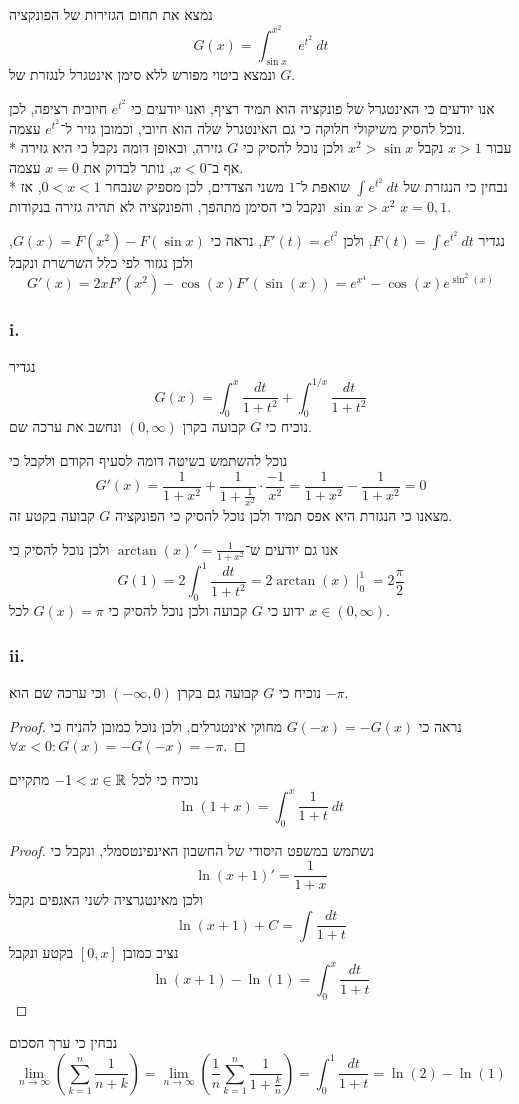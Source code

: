 \Question{}
נמצא את תחום הגזירות של הפונקציה
\[
	G(x) = \int_{\sin x}^{x^2} e^{t^2}\ dt
\]
ונמצא ביטוי מפורש ללא סימן אינטגרל לנגזרת של $G$.

אנו יודעים כי האינטגרל של פונקציה הוא תמיד רציף, ואנו יודעים כי $e^{t^2}$ חיובית רציפה, לכן נוכל להסיק משיקולי חלוקה כי גם האינטגרל שלה הוא חיובי, וכמובן גזיר ל־$e^{t^2}$ עצמה. \\*
עבור $x > 1$ נקבל $x^2 > \sin x$ ולכן נוכל להסיק כי $G$ גזירה, ובאופן דומה נקבל כי היא גזירה אף ב־$x < 0$, נותר לבדוק את $x = 0$ עצמה. \\*
נבחין כי הנגזרת של $\int e^{t^2}\ dt$ שואפת ל־$1$ משני הצדדים, לכן מספיק שנבחר $0 < x < 1$, אז $\sin x > x^2$ ונקבל כי הסימן מתהפך, והפונקציה לא תהיה גזירה בנקודות $x = 0, 1$.

נגדיר $F(t) = \int e^{t^2}\ dt$, ולכן $F'(t) = e^{t^2}$, נראה כי $G(x) = F(x^2) - F(\sin x)$, ולכן נגזור לפי כלל השרשרת ונקבל
\[
	G'(x) = 2x F'(x^2) - \cos(x) F'(\sin(x)) = e^{x^4} - \cos(x) e^{\sin^2(x)}
\]

\Subquestion{}
\subsubsection{i.}
נגדיר
\[
	G(x) = \int_{0}^{x} \frac{dt}{1 + t^2} + \int_{0}^{1/x} \frac{dt}{1 + t^2}
\]
נוכיח כי $G$ קבועה בקרן $(0, \infty)$ ונחשב את ערכה שם.

נוכל להשתמש בשיטה דומה לסעיף הקודם ולקבל כי
\[
	G'(x) = \frac{1}{1 + x^2} + \frac{1}{1 + \frac{1}{x^2}} \cdot \frac{-1}{x^2}
	= \frac{1}{1 + x^2} - \frac{1}{1 + x^2}
	= 0
\]
מצאנו כי הנגזרת היא אפס תמיד ולכן נוכל להסיק כי הפונקציה $G$ קבועה בקטע זה.

אנו גם יודעים ש־$\arctan(x)' = \frac{1}{1 + x^2}$ ולכן נוכל להסיק כי
\[
	G(1) = 2 \int_{0}^{1} \frac{dt}{1 + t^2}
	= 2\arctan(x) \mid_0^1
	= 2\frac{\pi}{2}
\]
ידוע כי $G$ קבועה ולכן נוכל להסיק כי $G(x) = \pi$ לכל $x \in (0, \infty)$.

\subsubsection{ii.}
נוכיח כי $G$ קבועה גם בקרן $(-\infty, 0)$ וכי ערכה שם הוא $-\pi$.
\begin{proof}
	נראה כי $G(-x) = -G(x)$ מחוקי אינטגרלים, ולכן נוכל כמובן להניח כי $\forall x < 0 : G(x) = -G(-x) = -\pi$.
\end{proof}

\Question{}
\Subquestion{}
נוכיח כי לכל $-1 < x \in \mathbb{R}$ מתקיים
\[
	\ln(1 + x) = \int_{0}^{x} \frac{1}{1 + t}\ dt
\]
\begin{proof}
	נשתמש במשפט היסודי של החשבון האינפינטסמלי, ונקבל כי
	\[
		\ln(x + 1)' = \frac{1}{1 + x}
	\]
	ולכן מאינטגרציה לשני האגפים נקבל
	\[
		\ln(x + 1) + C = \int \frac{dt}{1 + t}
	\]
	נציב כמובן $[0, x]$ בקטע ונקבל
	\[
		\ln(x + 1) - \ln(1) = \int_{0}^{x} \frac{dt}{1 + t}
	\]
\end{proof}
נבחין כי ערך הסכום
\[
	\lim_{n \to \infty} \left( \sum_{k = 1}^{n} \frac{1}{n + k} \right)
	= \lim_{n \to \infty} \left( \frac{1}{n} \sum_{k = 1}^{n} \frac{1}{1 + \frac{k}{n}} \right)
	= \int_{0}^{1} \frac{dt}{1 + t}
	= \ln(2) - \ln(1)
\]


